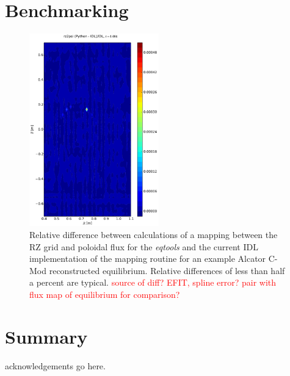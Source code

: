 \documentclass[12pt,floatfix,showpacs]{revtex4-1}
\newcommand{\note}[1]{\textcolor{red}{#1}}
\begin{document}
\section{Benchmarking}\label{sec:benchmark}

\begin{figure}[ht]
 \includegraphics[width=0.5\textwidth]{graphics/RZ2psi_rel_diff.pdf}
 \caption{Relative difference between calculations of a mapping between the RZ grid and poloidal flux for the \emph{eqtools} and the current IDL implementation of the mapping routine for an example Alcator C-Mod reconstructed equilibrium.  Relative differences of less than half a percent are typical.  \note{source of diff?  EFIT, spline error?  pair with flux map of equilibrium for comparison?}}
 \label{fig:rz2psi_diff}
\end{figure}

\section{Summary}\label{sec:summary}


\begin{acknowledgements}
 acknowledgements go here.
\end{acknowledgements}



\end{document}

